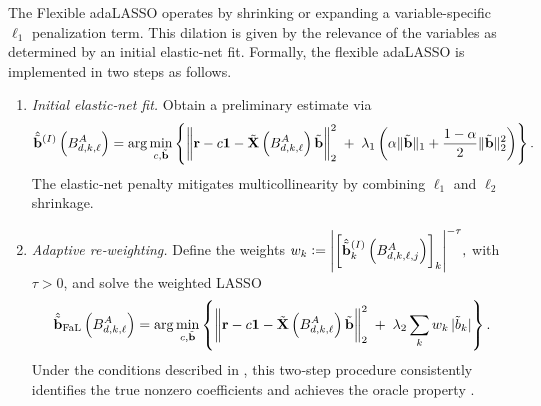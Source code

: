 \documentclass[10pt,a4paper,oneside]{article}
\DeclarePairedDelimiter{\norma}{\lVert}{\rVert} %
\DeclarePairedDelimiter{\aval}{\lvert}{\rvert} %
\begin{document}
The Flexible adaLASSO operates by shrinking or expanding a variable-specific $\ell_1$ penalization term. This dilation is given by the relevance of the variables as determined by an initial elastic-net fit. Formally, the flexible adaLASSO is implemented in two steps as follows.

\begin{enumerate}[label=(\roman*)]
    \item \emph{Initial elastic‐net fit.}  Obtain a preliminary estimate via
          \[
              \hat{\tilde{\mathbf{b}}}^{(I)} \left( B^A_{d, k, \ell} \right)
              = \arg\min_{c, \tilde{\mathbf{b}}} \left\{
              \norma*{\mathbf{r} - c \mathbf{1} - \tilde{\mathbf{X}} \left( B^A_{d, k, \ell}\right)\tilde{\mathbf{b}}}_2^2
              \;+\;\lambda_1\left(\alpha\|\tilde{\mathbf{b}}\|_1 + \frac{1-\alpha}{2} \|\tilde{\mathbf{b}}\|_2^2\right) \right\}.
          \]
          The elastic‐net penalty mitigates multicollinearity by combining \(\ell_1\) and \(\ell_2\) shrinkage.

    \item \emph{Adaptive re‐weighting.}  Define the weights
          \(
          w_k := \aval*{\left[\hat{\tilde{\mathbf{b}}}_k^{(I)}\left( B^A_{d, k, \ell, j} \right) \right]_{k}}^{-\tau},
          \)
          with \(\tau>0\), and solve the weighted LASSO
          \[
              \hat{\tilde{\mathbf{b}}}_{\mathrm{FaL}} \left( B^A_{d, k, \ell} \right)
              = \arg\min_{c, \tilde{\mathbf{b}}} \left\{
              \norma*{\mathbf{r} - c \mathbf{1} -  \tilde{\mathbf{X}} \left( B^A_{d, k, \ell}\right)\tilde{\mathbf{b}}}_2^2
              \;+\;\lambda_2\sum_{k} w_k\,|\tilde b_k| \right\}.
          \]
          Under the conditions described in \cite{MEDEIROS2016255}, this two‐step procedure consistently identifies the true nonzero coefficients and achieves the oracle property \cite{MEDEIROS2016255}.
\end{enumerate}
\end{document}
